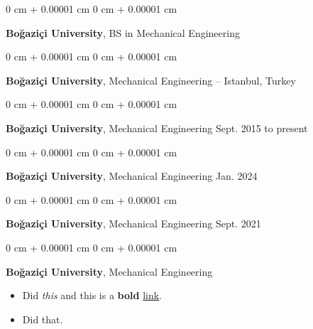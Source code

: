 \documentclass[10pt, letterpaper]{article}
\newenvironment{highlights}{
    \begin{itemize}[
        topsep=0.10 cm,
        parsep=0.10 cm,
        partopsep=0pt,
        itemsep=0pt,
        leftmargin=0 cm + 10pt
    ]
}{
    \end{itemize}
        
    \vspace{-0.20cm}
} %
\newenvironment{onecolentry}{
    \begin{adjustwidth}{
        0 cm + 0.00001 cm
    }{
        0 cm + 0.00001 cm
    }
}{
    \end{adjustwidth}
} %
\begin{document}
        \vspace{0.1 cm}

        \begin{onecolentry}
            \textbf{Boğaziçi University}, BS in Mechanical Engineering \hfill 
        \end{onecolentry}

        \vspace{0.1 cm}

        \begin{onecolentry}
            \textbf{Boğaziçi University}, Mechanical Engineering -- Istanbul, Turkey \hfill 
        \end{onecolentry}

        \vspace{0.1 cm}

        \begin{onecolentry}
            \textbf{Boğaziçi University}, Mechanical Engineering \hfill Sept. 2015 to present
        \end{onecolentry}

        \vspace{0.1 cm}

        \begin{onecolentry}
            \textbf{Boğaziçi University}, Mechanical Engineering \hfill Jan. 2024
        \end{onecolentry}

        \vspace{0.1 cm}

        \begin{onecolentry}
            \textbf{Boğaziçi University}, Mechanical Engineering \hfill Sept. 2021
        \end{onecolentry}

        \vspace{0.1 cm}

        \begin{onecolentry}
            \textbf{Boğaziçi University}, Mechanical Engineering \hfill 
            \begin{highlights}
                \item Did \textit{this} and this is a \textbf{bold} \href{https://example.com}{link}.
                \item Did that.
            \end{highlights}
        \end{onecolentry}

        \vspace{0.1 cm}
\end{document}
